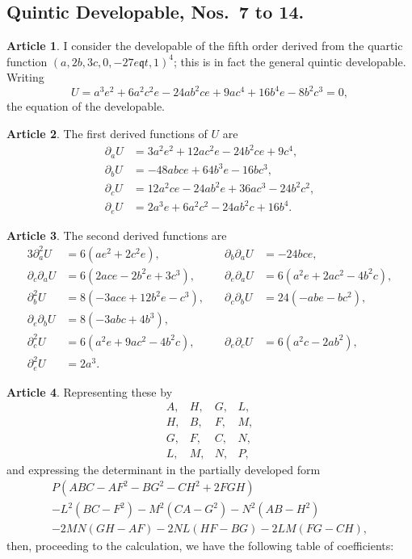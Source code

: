 \documentclass[11pt,a4paper]{article}
\theoremstyle{definition}
\newtheorem{art}{Article}[section]
\begin{document}
\subsection*{Quintic Developable, Nos.\ 7 to 14.}

\setcounter{art}{6}
\begin{art}
I consider the developable of the fifth order derived from the quartic function
$(a, 2b, 3c, 0, -27e \mathbin{\mathfrak{q}} t, 1)^4$; this is in fact the general quintic developable. Writing
\[
U = a^3e^2 + 6a^2c^2e - 24ab^2ce + 9ac^4 + 16b^4e - 8b^2c^3 = 0,
\]
the equation of the developable.
\end{art}

\begin{art}
The first derived functions of $U$ are
\begin{align*}
\partial_a U &= 3a^2e^2 + 12ac^2e - 24b^2ce + 9c^4, \\
\partial_b U &= -48abce + 64b^3e - 16bc^3, \\
\partial_c U &= 12a^2ce - 24ab^2e + 36ac^3 - 24b^2c^2, \\
\partial_e U &= 2a^3e + 6a^2c^2 - 24ab^2c + 16b^4.
\end{align*}
\end{art}

\begin{art}
The second derived functions are
\begin{alignat*}{3}
\partial_a^2 U &= 6(ae^2 + 2c^2e), \quad & \partial_b\partial_a U &= -24bce, \\
\partial_c\partial_a U &= 6(2ace - 2b^2e + 3c^3), \quad & \partial_e\partial_a U &= 6(a^2e + 2ac^2 - 4b^2c), \\
\partial_b^2 U &= 8(-3ace + 12b^2e - c^3), \quad & \partial_c\partial_b U &= 24(-abe - bc^2), \\
\partial_e\partial_b U &= 8(-3abc + 4b^3), \\
\partial_c^2 U &= 6(a^2e + 9ac^2 - 4b^2c), \quad & \partial_e\partial_c U &= 6(a^2c - 2ab^2), \\
\partial_e^2 U &= 2a^3.
\end{alignat*}
\end{art}

\begin{art}
Representing these by
\[
\begin{matrix}
A, & H, & G, & L, \\
H, & B, & F, & M, \\
G, & F, & C, & N, \\
L, & M, & N, & P,
\end{matrix}
\]
and expressing the determinant in the partially developed form
\begin{multline*}
P(ABC - AF^2 - BG^2 - CH^2 + 2FGH) \\
- L^2(BC - F^2) - M^2(CA - G^2) - N^2(AB - H^2) \\
- 2MN(GH - AF) - 2NL(HF - BG) - 2LM(FG - CH),
\end{multline*}
then, proceeding to the calculation, we have the following table of coefficients:
\end{art}
\end{document}
